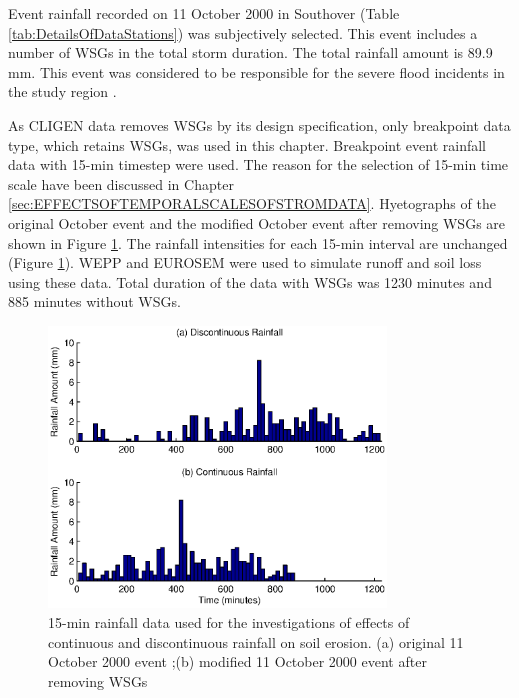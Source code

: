 Event rainfall recorded on 11 October 2000 in Southover (Table
\ref{tab:DetailsOfDataStations}) was subjectively selected. This event includes
a number of WSGs in the total storm duration. The total rainfall amount is 89.9
mm. This event was considered to be responsible for the severe flood incidents
in the study region \citep{boardman2001-346}.

As CLIGEN data removes WSGs by its design specification, only breakpoint data
type, which retains WSGs, was used in this chapter. Breakpoint event rainfall
data with 15-min timestep were used. The reason for the selection of 15-min time
scale have been discussed in Chapter
\ref{sec:EFFECTSOFTEMPORALSCALESOFSTROMDATA}. Hyetographs of the original
October event and the modified October event after removing WSGs are shown in
Figure \ref{fig:rainfall_discont_cont}. The rainfall intensities for each 15-min
interval are unchanged (Figure \ref{fig:rainfall_discont_cont}). WEPP and
EUROSEM were used to simulate runoff and soil loss using these data. Total
duration of the data with WSGs was 1230 minutes and 885 minutes without WSGs.

\begin{figure}[htpb]
  \centering
    \includegraphics[width=0.8\textwidth]
{./img/rainfall_discont_cont_input}
  \caption[15-min rainfall data used for the investigations of effects of
continuous and discontinuous rainfall on soil erosion.]{15-min rainfall data
used for the investigations of effects of continuous and discontinuous rainfall
on soil erosion. (a) original 11 October 2000 event ;(b) modified 11 October
2000 event after removing WSGs}
  \label{fig:rainfall_discont_cont}
\end{figure}

